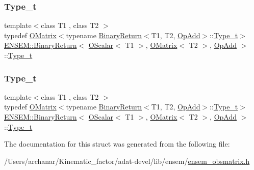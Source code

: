 \subsubsection{\texorpdfstring{Type\_t}{Type\_t}\hspace{0.1cm}{\footnotesize\ttfamily [2/3]}}
{\footnotesize\ttfamily template$<$class T1 , class T2 $>$ \\
typedef \mbox{\hyperlink{classENSEM_1_1OMatrix}{O\+Matrix}}$<$typename \mbox{\hyperlink{structENSEM_1_1BinaryReturn}{Binary\+Return}}$<$T1, T2, \mbox{\hyperlink{structENSEM_1_1OpAdd}{Op\+Add}}$>$\+::\mbox{\hyperlink{structENSEM_1_1BinaryReturn_3_01OScalar_3_01T1_01_4_00_01OMatrix_3_01T2_01_4_00_01OpAdd_01_4_ad9eaea6a80091a12d02ff490903ae0bd}{Type\+\_\+t}}$>$ \mbox{\hyperlink{structENSEM_1_1BinaryReturn}{E\+N\+S\+E\+M\+::\+Binary\+Return}}$<$ \mbox{\hyperlink{classENSEM_1_1OScalar}{O\+Scalar}}$<$ T1 $>$, \mbox{\hyperlink{classENSEM_1_1OMatrix}{O\+Matrix}}$<$ T2 $>$, \mbox{\hyperlink{structENSEM_1_1OpAdd}{Op\+Add}} $>$\+::\mbox{\hyperlink{structENSEM_1_1BinaryReturn_3_01OScalar_3_01T1_01_4_00_01OMatrix_3_01T2_01_4_00_01OpAdd_01_4_ad9eaea6a80091a12d02ff490903ae0bd}{Type\+\_\+t}}}

\mbox{\label{structENSEM_1_1BinaryReturn_3_01OScalar_3_01T1_01_4_00_01OMatrix_3_01T2_01_4_00_01OpAdd_01_4_ad9eaea6a80091a12d02ff490903ae0bd}} 
\subsubsection{\texorpdfstring{Type\_t}{Type\_t}\hspace{0.1cm}{\footnotesize\ttfamily [3/3]}}
{\footnotesize\ttfamily template$<$class T1 , class T2 $>$ \\
typedef \mbox{\hyperlink{classENSEM_1_1OMatrix}{O\+Matrix}}$<$typename \mbox{\hyperlink{structENSEM_1_1BinaryReturn}{Binary\+Return}}$<$T1, T2, \mbox{\hyperlink{structENSEM_1_1OpAdd}{Op\+Add}}$>$\+::\mbox{\hyperlink{structENSEM_1_1BinaryReturn_3_01OScalar_3_01T1_01_4_00_01OMatrix_3_01T2_01_4_00_01OpAdd_01_4_ad9eaea6a80091a12d02ff490903ae0bd}{Type\+\_\+t}}$>$ \mbox{\hyperlink{structENSEM_1_1BinaryReturn}{E\+N\+S\+E\+M\+::\+Binary\+Return}}$<$ \mbox{\hyperlink{classENSEM_1_1OScalar}{O\+Scalar}}$<$ T1 $>$, \mbox{\hyperlink{classENSEM_1_1OMatrix}{O\+Matrix}}$<$ T2 $>$, \mbox{\hyperlink{structENSEM_1_1OpAdd}{Op\+Add}} $>$\+::\mbox{\hyperlink{structENSEM_1_1BinaryReturn_3_01OScalar_3_01T1_01_4_00_01OMatrix_3_01T2_01_4_00_01OpAdd_01_4_ad9eaea6a80091a12d02ff490903ae0bd}{Type\+\_\+t}}}



The documentation for this struct was generated from the following file\+:\begin{DoxyCompactItemize}
\item 
/\+Users/archanar/\+Kinematic\+\_\+factor/adat-\/devel/lib/ensem/\mbox{\hyperlink{adat-devel_2lib_2ensem_2ensem__obsmatrix_8h}{ensem\+\_\+obsmatrix.\+h}}\end{DoxyCompactItemize}
